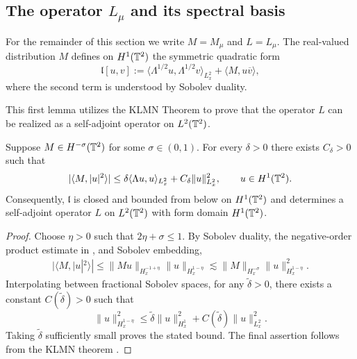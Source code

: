 \subsection{The operator \(L_{\mu}\) and its spectral basis}\label{sec_invdynamics_mildsolution}

For the remainder of this section we write $M = M_{\mu}$ and $L = L_{\mu}$.
The real-valued distribution $M$ defines on $H^1(\mathbb{T}^2)$ the symmetric
quadratic form
\[
    \mathfrak l[u,v]
    :=\langle \Lambda^{1/2}u,\Lambda^{1/2}v\rangle_{L^2_x}
      +\langle M,u\overline v\rangle,
\]
where the second term is understood by Sobolev duality.

This first lemma utilizes the KLMN Theorem to prove that the operator $L$ can be realized as a self-adjoint operator on $L^2(\mathbb{T}^2)$.
\begin{lemma}\label{lem:relative_bound}
Suppose $M\in H^{-\sigma}(\mathbb{T}^2)$ for some $\sigma\in(0,1)$.
For every $\delta>0$ there exists $C_\delta>0$ such that
\[
    |\langle M,|u|^2\rangle|
    \leq
    \delta\langle\Lambda u,u\rangle_{L^2_x}
    +C_\delta\|u\|_{L^2_x}^2,
    \qquad u\in H^1(\mathbb{T}^2).
\]
Consequently, $\mathfrak l$ is closed and bounded from below on
$H^1(\mathbb{T}^2)$ and determines a self-adjoint operator $L$ on
$L^2(\mathbb{T}^2)$ with form domain $H^1(\mathbb{T}^2)$.
\end{lemma}

\begin{proof}
Choose $\eta>0$ such that $2\eta+\sigma\leq1$.  By Sobolev duality,
the negative-order product estimate in \cite[Proposition~2]{Benyi2025},
and Sobolev embedding,
\begin{align*}
    |\langle M,|u|^2\rangle|
    \leq
    \|Mu\|_{H^{-1+\eta}_x}\|u\|_{H^{1-\eta}_x}
    \lesssim
    \|M\|_{H^{-\sigma}_x}\|u\|_{H^{1-\eta}_x}^2.
\end{align*}
Interpolating between fractional Sobolev spaces, for any $\tilde{\delta} > 0$, there exists a constant $C(\tilde{\delta}) > 0$ such that
\[
    \|u\|_{H^{1-\eta}_x}^2
    \leq
    \widetilde\delta\|u\|_{H^1_x}^2
    +C(\widetilde{\delta})\|u\|_{L^2_x}^2.
\]
Taking $\widetilde\delta$ sufficiently small proves the stated bound.
The final assertion follows from the KLMN theorem
\cite[Theorem~10.21]{schmudgen_operators}.
\end{proof}

